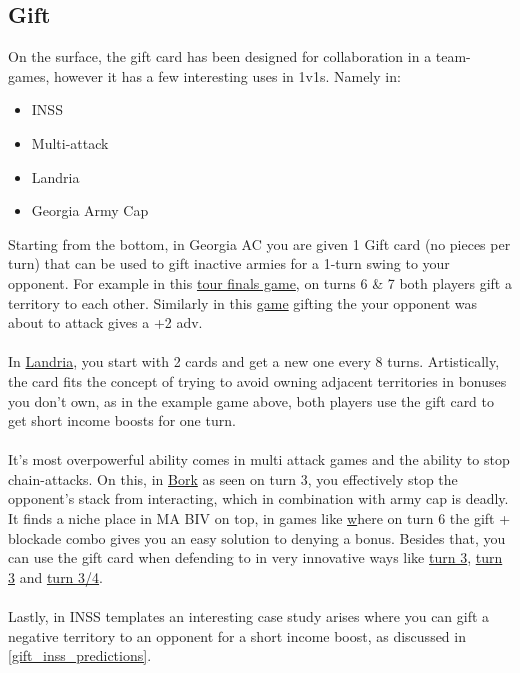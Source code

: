 \subsection{Gift}

On the surface, the gift card has been designed for collaboration in a team-games, however it has a few interesting uses in 1v1s. Namely in:

\begin{itemize}
    \item INSS
    \item Multi-attack
    \item Landria
    \item Georgia Army Cap
\end{itemize}

Starting from the bottom, in Georgia AC you are given 1 Gift card (no pieces per turn) that can be used to gift inactive armies for a 1-turn swing to your opponent. For example in this \href{https://www.warzone.com/MultiPlayer?GameID=34217026}{tour finals game}, on turns 6 \& 7 both players gift a territory to each other. Similarly in this \href{https://www.warzone.com/MultiPlayer?GameID=22213205}{game} gifting the your opponent was about to attack gives a +2 adv.
\\
\\
In \href{https://www.warzone.com/MultiPlayer?GameID=37715739}{Landria}, you start with 2 cards and get a new one every 8 turns. Artistically, the card fits the concept of trying to avoid owning adjacent territories in bonuses you don't own, as in the example game above, both players use the gift card to get short income boosts for one turn.
\\
\\
It's most overpowerful ability comes in multi attack games and the ability to stop chain-attacks. On this, in \href{https://www.warzone.com/MultiPlayer?GameID=27236085}{Bork} as seen on turn 3, you effectively stop the opponent's stack from interacting, which in combination with army cap is deadly. It finds a niche place in MA BIV on top, in games like \href{https://www.warzone.com/MultiPlayer?GameID=39224977} where on turn 6 the gift + blockade combo gives you an easy solution to denying a bonus. Besides that, you can use the gift card when defending to in very innovative ways like \href{https://www.warzone.com/MultiPlayer?GameID=40629198}{turn 3}, \href{https://www.warzone.com/MultiPlayer?GameID=41147339}{turn 3} and \href{https://www.warzone.com/MultiPlayer?GameID=38091349}{turn 3/4}.
\\
\\
Lastly, in INSS templates an interesting case study arises where you can gift a negative territory to an opponent for a short income boost, as discussed in \ref{gift_inss_predictions}.


